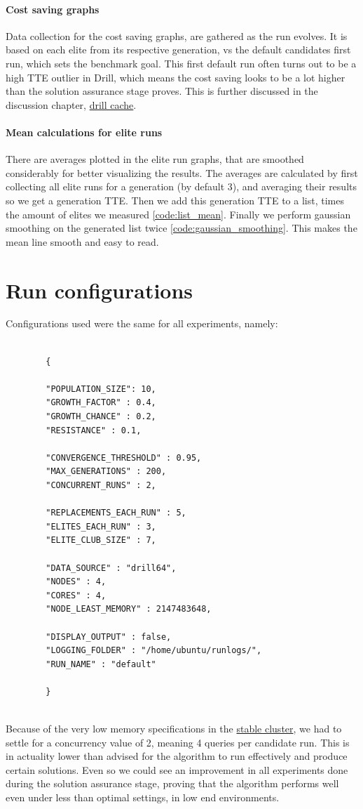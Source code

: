 \documentclass[a4paper,english]{report}
\begin{document}
	\paragraph{Cost saving graphs}
	Data collection for the cost saving graphs, are gathered as the run evolves. It is based on each elite from its respective generation, vs the default candidates first run, which sets the benchmark goal. This first default run often turns out to be a high TTE outlier in Drill, which means the cost saving looks to be a lot higher than the solution assurance stage proves. This is further discussed in the discussion chapter, \hyperref[sec:cache]{drill cache}.
	\paragraph{Mean calculations for elite runs}
	There are averages plotted in the elite run graphs, that are smoothed considerably for better visualizing the results. The averages are calculated by first collecting all elite runs for a generation (by default 3), and averaging their results so we get a generation TTE. Then we add this generation TTE to a list, times the amount of elites we measured \ref{code:list_mean}. Finally we perform gaussian smoothing on the generated list twice \ref{code:gaussian_smoothing}. This makes the mean line smooth and easy to read.
	\clearpage
	\section{Run configurations}
	Configurations used were the same for all experiments, namely:
	\begin{verbatim}
	
		{
		
		"POPULATION_SIZE": 10,
		"GROWTH_FACTOR" : 0.4,
		"GROWTH_CHANCE" : 0.2,
		"RESISTANCE" : 0.1,
		
		"CONVERGENCE_THRESHOLD" : 0.95,
		"MAX_GENERATIONS" : 200,
		"CONCURRENT_RUNS" : 2,
		
		"REPLACEMENTS_EACH_RUN" : 5,
		"ELITES_EACH_RUN" : 3,
		"ELITE_CLUB_SIZE" : 7,
		
		"DATA_SOURCE" : "drill64",
		"NODES" : 4,
		"CORES" : 4,
		"NODE_LEAST_MEMORY" : 2147483648,
		
		"DISPLAY_OUTPUT" : false,
		"LOGGING_FOLDER" : "/home/ubuntu/runlogs/",
		"RUN_NAME" : "default"
		
		}
		
	\end{verbatim}
	Because of the very low memory specifications in the \hyperref[table:cluster_stable]{stable cluster}, we had to settle for a concurrency value of 2, meaning 4 queries per candidate run. This is in actuality lower than advised for the algorithm to run effectively and produce certain solutions. Even so we could see an improvement in all experiments done during the solution assurance stage, proving that the algorithm performs well even under less than optimal settings, in low end environments.
	\clearpage
\end{document}
